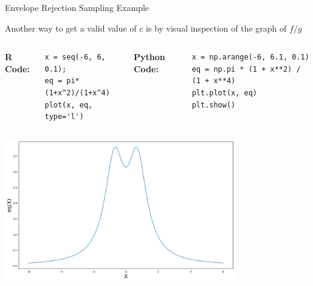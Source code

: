 \documentclass[8pt]{beamer}
\begin{document}
\begin{frame}[fragile]{Envelope Rejection Sampling Example}

Another way to get a valid value of $c$ is by visual inspection of the graph of $f/g$

\vspace{2mm}

\begin{columns}
{\bf R Code:}
\begin{lstlisting}
x = seq(-6, 6, 0.1);
eq = pi*(1+x^2)/(1+x^4)
plot(x, eq, type='l')
\end{lstlisting}

{\bf Python Code:}
\begin{lstlisting}
x = np.arange(-6, 6.1, 0.1)
eq = np.pi * (1 + x**2) / (1 + x**4)
plt.plot(x, eq)
plt.show()
\end{lstlisting}
\end{columns}

\begin{center}
\includegraphics[width=0.75\textwidth]{chapter1-part3-plot3.png}
\end{center}
\end{frame}
\end{document}
